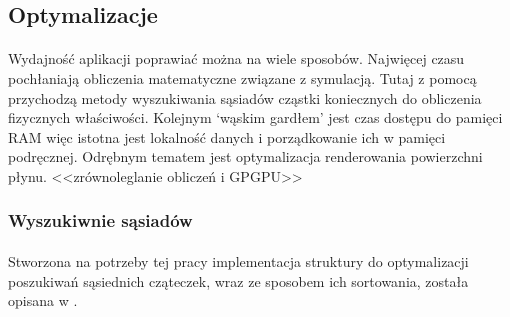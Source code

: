 \par


\subsection{Optymalizacje}

\paragraph{}
Wydajność aplikacji poprawiać można na wiele sposobów. Najwięcej czasu pochłaniają obliczenia matematyczne związane z symulacją. Tutaj z pomocą przychodzą metody wyszukiwania sąsiadów cząstki koniecznych do obliczenia fizycznych właściwości. Kolejnym `wąskim gardłem' jest czas dostępu do pamięci RAM więc istotna jest lokalność danych i porządkowanie ich w pamięci podręcznej. Odrębnym tematem jest optymalizacja renderowania powierzchni płynu. <<zrównoleglanie obliczeń i GPGPU>>
\par

\subsubsection{Wyszukiwnie sąsiadów}
\label{subsubsec:neighbour_search}

\paragraph{}
Stworzona na potrzeby tej pracy implementacja struktury do optymalizacji poszukiwań sąsiednich cząteczek, wraz ze sposobem ich sortowania, została opisana w \cite{ihmsen13}.
\par

